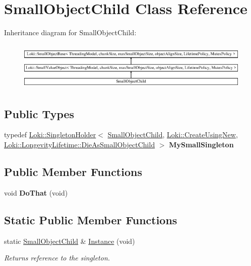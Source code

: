 \hypertarget{classSmallObjectChild}{}\section{Small\+Object\+Child Class Reference}
\label{classSmallObjectChild}
Inheritance diagram for Small\+Object\+Child\+:\begin{figure}[H]
\begin{center}
\leavevmode
\includegraphics[height=2.349650cm]{classSmallObjectChild}
\end{center}
\end{figure}
\subsection*{Public Types}
\begin{DoxyCompactItemize}
\item 
\hypertarget{classSmallObjectChild_a0fa9ca89abd53d3216563c07c847f2d2}{}typedef \hyperlink{classLoki_1_1SingletonHolder}{Loki\+::\+Singleton\+Holder}$<$ \hyperlink{classSmallObjectChild}{Small\+Object\+Child}, \hyperlink{structLoki_1_1CreateUsingNew}{Loki\+::\+Create\+Using\+New}, \hyperlink{structLoki_1_1LongevityLifetime_1_1DieAsSmallObjectChild}{Loki\+::\+Longevity\+Lifetime\+::\+Die\+As\+Small\+Object\+Child} $>$ {\bfseries My\+Small\+Singleton}\label{classSmallObjectChild_a0fa9ca89abd53d3216563c07c847f2d2}

\end{DoxyCompactItemize}
\subsection*{Public Member Functions}
\begin{DoxyCompactItemize}
\item 
\hypertarget{classSmallObjectChild_a02542816d11ffac1c44fafcdc505d254}{}void {\bfseries Do\+That} (void)\label{classSmallObjectChild_a02542816d11ffac1c44fafcdc505d254}

\end{DoxyCompactItemize}
\subsection*{Static Public Member Functions}
\begin{DoxyCompactItemize}
\item 
\hypertarget{classSmallObjectChild_ad815881f1e0691bc800743d5631ee8f0}{}static \hyperlink{classSmallObjectChild}{Small\+Object\+Child} \& \hyperlink{classSmallObjectChild_ad815881f1e0691bc800743d5631ee8f0}{Instance} (void)\label{classSmallObjectChild_ad815881f1e0691bc800743d5631ee8f0}

\begin{DoxyCompactList}\small\item\em Returns reference to the singleton. \end{DoxyCompactList}\end{DoxyCompactItemize}
